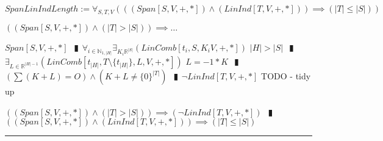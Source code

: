 \documentclass{book}
\newcommand{\abr}{:=}
\newcommand{\pipe}{$\phantom{(}\vrectangleblack\phantom{)}$}
\begin{document}
\begin{comment}
  \begin{shaded} %
  $SubDirSum \abr \forall_{U, V}(((FinDim[V, +, *]) \land (Subspace[U, V, +, *])) \implies (\exists_{W}((Subspace[W, V, +, *]) \land (DirSum[V, U, W, V, +, *]))))$
  \begin{enumerate}
    \lit $FinSubSpace$ \pipe $FinDim[U, +, *]$
    \lit $(FinDimBasis) \land (FinDim[U, +, *])$ \pipe $\exists_{B}(Basis[B, U, +, *])$ \pipe $LinInd[B, U, +, *]$ \pipe $LinInd[B, V, +, *]$ NEWTHM
    \lit $(LinIndExpandBasis) \land (LinInd[B, V, +, *])$ \pipe $\exists_{C}((B \subseteq C) \land (Basis[C, V, +, *]))$
    \lit $(LinSpanSubContains) \land (W \abr LinSpan[C \setminus B])$ \pipe $Subspace[W, V, +, *]$
    \lit $(v \in V) \implies \ldots$
    \begin{enumerate}
      \lit $v = \sum(r_i * c_i) = \sum(r_i * w_i) + \sum(r_i * b_i) \in W + U)$
    \end{enumerate}
    \lit $(v \in V) \implies (v \in U + W)$ \pipe $\forall_{v \in V}(v \in U + W)$ \pipe $SetSum[V, U, W, V +, *]$
    \lit $(v \in U \cap W) \implies \ldots$
    \begin{enumerate}
      \lit TODO : $LinInd$ \pipe $\ldots v = O$
    \end{enumerate}
    \lit $(v \in U \cap W) \iff (v = O)$ \pipe $U \cap W = \{O\}$
    \lit $(SetSum[V, U, W, V +, *]) \land (U \cap W = \{O\})$
    \lit $DirSumEquiv$ \pipe $DirSum[V, U, W, V, +, *]$
  \end{enumerate} \vspace{.75mm} \hrule \vspace{.75mm} \ \\ 
  \end{shaded} %
\end{comment}

$SpanLinIndLength \abr \forall_{S, T, V}(((Span[S, V, +, *]) \land (LinInd[T, V, +, *])) \implies (|T| \leq |S|))$
\begin{enumerate}
  \lit $((Span[S, V, +, *]) \land (|T| > |S|)) \implies \ldots$
  \begin{enumerate}
    \lit $Span[S, V, +, *]$ \pipe $\forall_{i \in \mathbb{N}_{1, |H|}} \exists_{K_i \mathbb{R}^{|S|}}(LinComb[t_i, S, K_i V, +, *])$
    \lit $|H| > |S|$ \pipe $\exists_{L \in \mathbb{R}^{|H| - 1}}(LinComb[t_{|H|}, T \setminus \{t_{|H|}\}, L, V, +, *])$
    \lit $L = -1 * K$ \pipe $(\sum(K + L) = O) \land (K + L \neq \{0\}^{|T|})$ \pipe $\lnot LinInd[T, V, +, *]$
    \lit TODO - tidy up
  \end{enumerate}
  \lit $((Span[S, V, +, *]) \land (|T| > |S|)) \implies (\lnot LinInd[T, V, +, *])$ \pipe $((Span[S, V, +, *]) \land (LinInd[T, V, +, *])) \implies (|T| \leq |S|)$
\end{enumerate} \vspace{.75mm} \hrule \vspace{.75mm} \  \\
\end{document}
